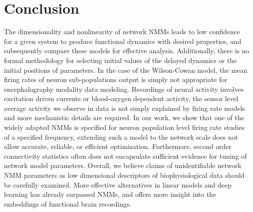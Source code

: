 \section{Conclusion}
The dimensionality and nonlinearity of network NMMs leads to low confidence for a given system to produce functional dynamics with desired properties, and subsequently compare these models for effective analysis. Additionally, there is no formal methodology for selecting initial values of the delayed dynamics or the initial positions of parameters. In the case of the Wilson-Cowan model, the mean firing rates of neuron sub-populations output is simply not appropriate for encephalography modality data modeling. Recordings of neural activity involves excitation driven currents or blood-oxygen dependent activity, the sensor level average activity we observe in data is not simply explained by firing rate models and more mechanistic details are required. In our work, we show that one of the widely adapted NMMs is specified for neuron population level firing rate studies of a specified frequency, extending such a model to the network scale does not allow accurate, reliable, or efficient optimization. Furthermore, second order connectivity statistics often does not encapsulate sufficient evidence for tuning of network model parameters. Overall, we believe claims of unidentifiable network NMM parameters as low dimensional descriptors of biophysiological data should be carefully examined. More effective alternatives in linear models and deep learning has already surpassed NMMs, and offers more insight into the embeddings of functional brain recordings.